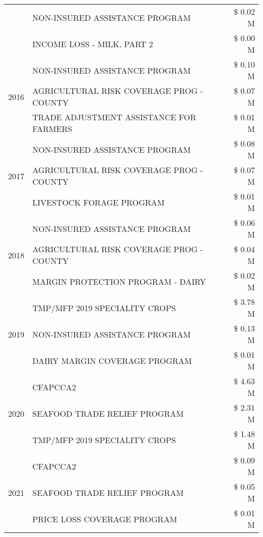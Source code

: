 \begin{tabular}{llr}
 & NON-INSURED ASSISTANCE PROGRAM & \$ 0.02 M \\
 & INCOME LOSS - MILK, PART 2 & \$ 0.00 M \\
\cline{1-3}
\multirow[t]{3}{*}{2016} & NON-INSURED ASSISTANCE PROGRAM & \$ 0.10 M \\
 & AGRICULTURAL RISK COVERAGE PROG - COUNTY & \$ 0.07 M \\
 & TRADE ADJUSTMENT ASSISTANCE FOR FARMERS & \$ 0.01 M \\
\cline{1-3}
\multirow[t]{3}{*}{2017} & NON-INSURED ASSISTANCE PROGRAM & \$ 0.08 M \\
 & AGRICULTURAL RISK COVERAGE PROG - COUNTY & \$ 0.07 M \\
 & LIVESTOCK FORAGE PROGRAM & \$ 0.01 M \\
\cline{1-3}
\multirow[t]{3}{*}{2018} & NON-INSURED ASSISTANCE PROGRAM & \$ 0.06 M \\
 & AGRICULTURAL RISK COVERAGE PROG - COUNTY & \$ 0.04 M \\
 & MARGIN PROTECTION PROGRAM - DAIRY & \$ 0.02 M \\
\cline{1-3}
\multirow[t]{3}{*}{2019} & TMP/MFP 2019 SPECIALITY CROPS & \$ 3.78 M \\
 & NON-INSURED ASSISTANCE PROGRAM & \$ 0.13 M \\
 & DAIRY MARGIN COVERAGE PROGRAM & \$ 0.01 M \\
\cline{1-3}
\multirow[t]{3}{*}{2020} & CFAPCCA2 & \$ 4.63 M \\
 & SEAFOOD TRADE RELIEF PROGRAM & \$ 2.31 M \\
 & TMP/MFP 2019 SPECIALITY CROPS & \$ 1.48 M \\
\cline{1-3}
\multirow[t]{3}{*}{2021} & CFAPCCA2 & \$ 0.09 M \\
 & SEAFOOD TRADE RELIEF PROGRAM & \$ 0.05 M \\
 & PRICE LOSS COVERAGE PROGRAM & \$ 0.01 M \\
\cline{1-3}
\bottomrule
\end{tabular}

